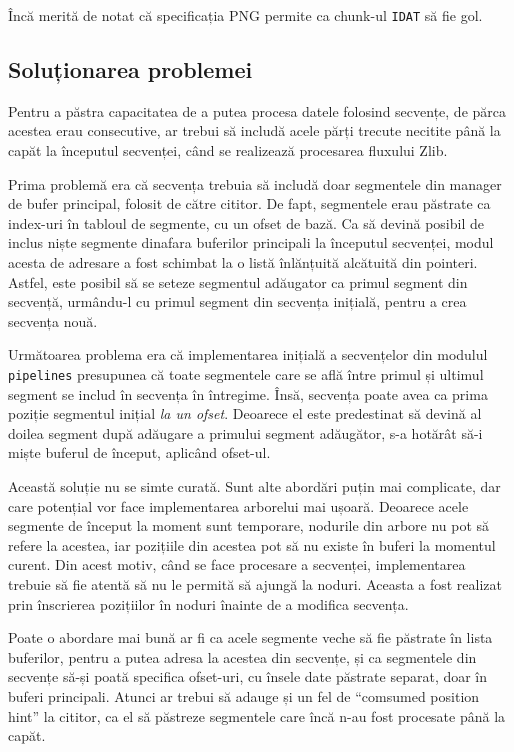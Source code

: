 \documentclass[a4paper,12pt]{report}
\begin{document}
Încă merită de notat că specificația \ac{PNG} permite ca chunk-ul \texttt{IDAT} să fie gol.

\subsection{Soluționarea problemei}

Pentru a păstra capacitatea de a putea procesa datele folosind secvențe,
de părca acestea erau consecutive, ar trebui să includă acele părți trecute necitite până la capăt
la începutul secvenței, când se realizează procesarea fluxului Zlib.

Prima problemă era că secvența trebuia să includă doar segmentele din manager de bufer principal,
folosit de către cititor.
De fapt, segmentele erau păstrate ca index-uri în tabloul de segmente, cu un ofset de bază.
Ca să devină posibil de inclus niște segmente dinafara buferilor principali la începutul secvenței,
modul acesta de adresare a fost schimbat la o listă înlănțuită alcătuită din pointeri.
Astfel, este posibil să se seteze segmentul adăugator ca primul segment din secvență, urmându-l cu
primul segment din secvența inițială, pentru a crea secvența nouă.

Următoarea problema era că implementarea inițială a secvențelor din modulul \texttt{pipelines} presupunea
că toate segmentele care se află între primul și ultimul segment se includ în secvența în întregime.
Însă, secvența poate avea ca prima poziție segmentul inițial \textit{la un ofset}.
Deoarece el este predestinat să devină al doilea segment după adăugare a primului segment adăugător,
s-a hotărât să-i miște buferul de început, aplicând ofset-ul.

Această soluție nu se simte curată.
Sunt alte abordări puțin mai complicate, dar care potențial vor face implementarea arborelui mai ușoară.
Deoarece acele segmente de început la moment sunt temporare,
nodurile din arbore nu pot să refere la acestea, iar pozițiile din acestea pot să nu existe în buferi la momentul curent.
Din acest motiv, când se face procesare a secvenței, implementarea trebuie să fie atentă
să nu le permită să ajungă la noduri.
Aceasta a fost realizat prin înscrierea pozițiilor în noduri înainte de a modifica secvența.

Poate o abordare mai bună ar fi ca acele segmente veche să fie păstrate în lista buferilor,
pentru a putea adresa la acestea din secvențe,
și ca segmentele din secvențe să-și poată specifica ofset-uri,
cu însele date păstrate separat, doar în buferi principali.
Atunci ar trebui să adauge și un fel de ``comsumed position hint'' la cititor,
ca el să păstreze segmentele care încă n-au fost procesate până la capăt.
\end{document}
